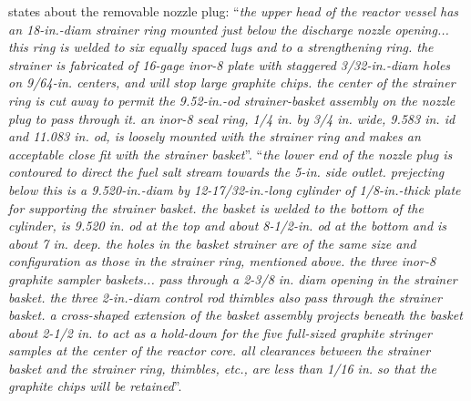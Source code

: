 \documentclass[ms,a4paper]{memoir}
\begin{document}
\parencite[page 105]{ornl-tm-0728} states about the removable nozzle plug:
\enquote{\textit{the upper head of the reactor vessel has an 18-in.-diam strainer ring mounted just below the discharge nozzle opening... this ring is welded to six equally spaced lugs and to a strengthening ring. the strainer is fabricated of 16-gage inor-8 plate with staggered 3/32-in.-diam holes on 9/64-in. centers, and will stop large graphite chips. the center of the strainer ring is cut away to permit the 9.52-in.-od strainer-basket assembly on the nozzle plug to pass through it. an inor-8 seal ring, 1/4 in. by 3/4 in. wide, 9.583 in. id and 11.083 in. od, is loosely mounted with the strainer ring and makes an acceptable close fit with the strainer basket}}.
\enquote{\textit{the lower end of the nozzle plug is contoured to direct the fuel salt stream towards the 5-in. side outlet. prejecting below this is a 9.520-in.-diam by 12-17/32-in.-long cylinder of 1/8-in.-thick plate for supporting the strainer basket. the basket is welded to the bottom of the cylinder, is 9.520 in. od at the top and about 8-1/2-in. od at the bottom and is about 7 in. deep. the holes in the basket strainer are of the same size and configuration as those in the strainer ring, mentioned above. the three inor-8 graphite sampler baskets... pass through a 2-3/8 in. diam opening in the strainer basket. the three 2-in.-diam control rod thimbles also pass through the strainer basket. a cross-shaped extension of the basket assembly projects beneath the basket about 2-1/2 in. to act as a hold-down for the five full-sized graphite stringer samples at the center of the reactor core. all clearances between the strainer basket and the strainer ring, thimbles, etc., are less than 1/16 in. so that the graphite chips will be retained}}.
\end{document}
